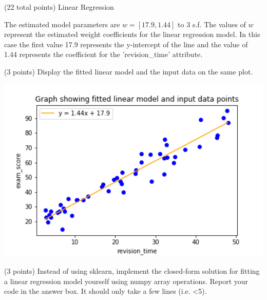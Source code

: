 \documentclass[12pt]{article}
\begin{document}
\begin{question}{(22 total points) Linear Regression}
\begin{subquestion}
\begin{answerbox}{10em}
The estimated model parameters are $w = [17.9, 1.44]$ to 3 s.f. The values of $w$ represent the estimated weight coefficients for the linear regression model. In this case the first value 17.9 represents the y-intercept of the line and the value of 1.44 represents the coefficient for the 'revision\_time' attribute.  
\end{answerbox}



\end{subquestion}



%
%
\begin{subquestion}{(3 points) Display the fitted linear model and the input data on the same plot.
}


\begin{answerbox}{35em}
\includegraphics[width = 1.0\textwidth]{q1_c.png}
\end{answerbox}



\end{subquestion}



%
%
\begin{subquestion}{(3 points) Instead of using sklearn, implement the closed-form solution for fitting a linear regression model yourself using numpy array operations.  
Report your code in the answer box.
It should only take a few lines (i.e. <5).\\ 
}



\end{subquestion}
\end{question}
\end{document}
